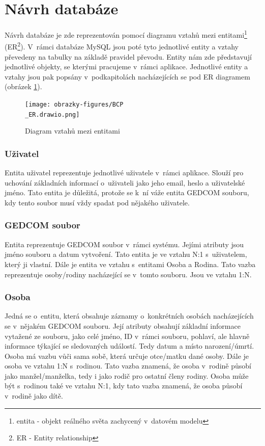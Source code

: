 \section{Návrh databáze}

Návrh databáze je zde reprezentován pomocí diagramu vztahů mezi entitami\footnote{entita - objekt reálného světa zachycený v~datovém modelu} (ER\footnote{ER - Entity relationship}). V~rámci databáze MySQL jsou poté tyto jednotlivé entity a vztahy převedeny na tabulky na základě pravidel převodu. Entity nám zde představují jednotlivé objekty, se kterými pracujeme v~rámci aplikace. Jednotlivé entity a vztahy jsou pak popsány v~podkapitolách nacházejících se pod ER diagramem (obrázek \ref{figure_ER}).

\begin{figure}[H]
	\centering
	\texttt{[image: obrazky-figures/BCP\\\_ER.drawio.png]}
	\caption[ER diagram]{Diagram vztahů mezi entitami}
	\label{figure_ER}
\end{figure}

\subsubsection{Uživatel}

Entita uživatel reprezentuje jednotlivé uživatele v~rámci aplikace. Slouží pro uchování základních informací o~uživateli jako jeho email, heslo a uživatelské jméno. Tato entita je důležitá, protože se k~ní váže entita GEDCOM souboru, kdy tento soubor musí vždy spadat pod nějakého uživatele.

\subsubsection{GEDCOM soubor}

Entita reprezentuje GEDCOM soubor v~rámci systému. Jejími atributy jsou jméno souboru a datum vytvoření. Tato entita je ve vztahu N:1 s~uživatelem, který ji vlastní. Dále je entita ve vztahu s~entitami Osoba a Rodina. Tato vazba reprezentuje osoby/rodiny nacházející se v~tomto souboru. Jsou ve vztahu 1:N.

\subsubsection{Osoba}

Jedná se o~entitu, která obsahuje záznamy o~konkrétních osobách nacházejících se v~nějakém GEDCOM souboru. Její atributy obsahují základní informace vytažené ze souboru, jako celé jméno, ID v~rámci souboru, pohlaví, ale hlavně informace týkající se sledovaných událostí. Tedy datum a místo narození/úmrtí. Osoba má vazbu vůči sama sobě, která určuje otce/matku dané osoby. Dále je osoba ve vztahu 1:N s~rodinou. Tato vazba znamená, že osoba v~rodině působí jako manžel/manželka, tedy i jako rodič pro ostatní členy rodiny. Osoba může být s~rodinou také ve vztahu N:1, kdy tato vazba znamená, že osoba působí v~rodině jako dítě.

